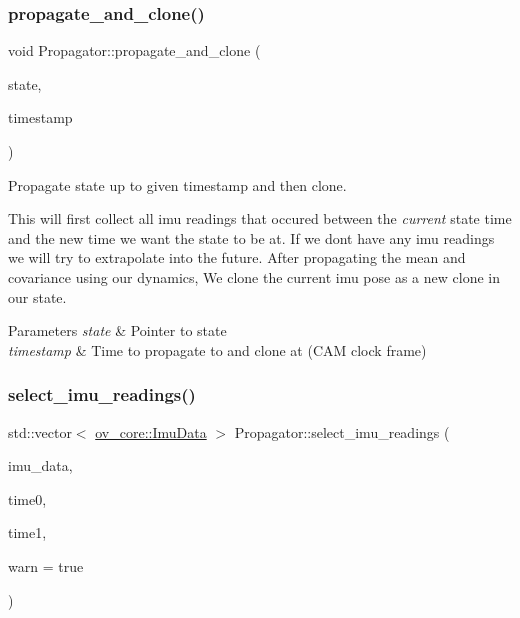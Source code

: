 \subsubsection{\texorpdfstring{propagate\+\_\+and\+\_\+clone()}{propagate\_and\_clone()}}
{\footnotesize\ttfamily void Propagator\+::propagate\+\_\+and\+\_\+clone (\begin{DoxyParamCaption}\item[{std\+::shared\+\_\+ptr$<$ \hyperlink{classov__msckf_1_1State}{State} $>$}]{state,  }\item[{double}]{timestamp }\end{DoxyParamCaption})}



Propagate state up to given timestamp and then clone. 

This will first collect all imu readings that occured between the {\itshape current} state time and the new time we want the state to be at. If we don\textquotesingle{}t have any imu readings we will try to extrapolate into the future. After propagating the mean and covariance using our dynamics, We clone the current imu pose as a new clone in our state.


\begin{DoxyParams}{Parameters}
{\em state} & Pointer to state \\
\hline
{\em timestamp} & Time to propagate to and clone at (C\+AM clock frame) \\
\hline
\end{DoxyParams}
\mbox{\label{classov__msckf_1_1Propagator_a2f2d18be72bfc40bab5ae5eab2bae10e}} 
\subsubsection{\texorpdfstring{select\+\_\+imu\+\_\+readings()}{select\_imu\_readings()}}
{\footnotesize\ttfamily std\+::vector$<$ \hyperlink{structov__core_1_1ImuData}{ov\+\_\+core\+::\+Imu\+Data} $>$ Propagator\+::select\+\_\+imu\+\_\+readings (\begin{DoxyParamCaption}\item[{const std\+::vector$<$ \hyperlink{structov__core_1_1ImuData}{ov\+\_\+core\+::\+Imu\+Data} $>$ \&}]{imu\+\_\+data,  }\item[{double}]{time0,  }\item[{double}]{time1,  }\item[{bool}]{warn = {\ttfamily true} }\end{DoxyParamCaption})\hspace{0.3cm}{\ttfamily [static]}}



